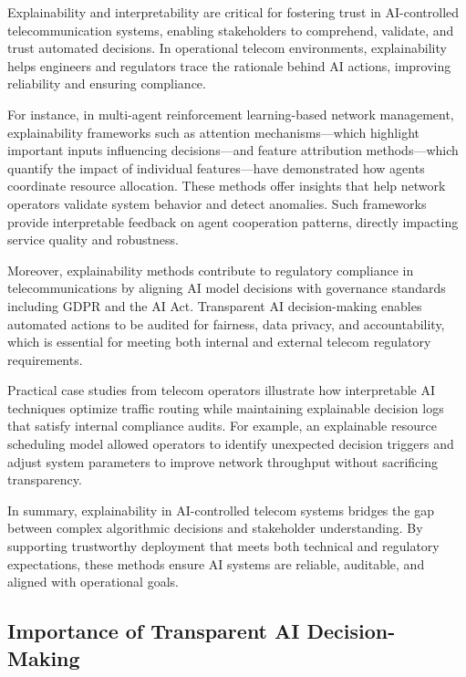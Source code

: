 \documentclass[sigconf]{acmart}
\begin{document}
Explainability and interpretability are critical for fostering trust in AI-controlled telecommunication systems, enabling stakeholders to comprehend, validate, and trust automated decisions. In operational telecom environments, explainability helps engineers and regulators trace the rationale behind AI actions, improving reliability and ensuring compliance.

For instance, in multi-agent reinforcement learning-based network management, explainability frameworks such as attention mechanisms—which highlight important inputs influencing decisions—and feature attribution methods—which quantify the impact of individual features—have demonstrated how agents coordinate resource allocation. These methods offer insights that help network operators validate system behavior and detect anomalies. Such frameworks provide interpretable feedback on agent cooperation patterns, directly impacting service quality and robustness.

Moreover, explainability methods contribute to regulatory compliance in telecommunications by aligning AI model decisions with governance standards including GDPR and the AI Act. Transparent AI decision-making enables automated actions to be audited for fairness, data privacy, and accountability, which is essential for meeting both internal and external telecom regulatory requirements.

Practical case studies from telecom operators illustrate how interpretable AI techniques optimize traffic routing while maintaining explainable decision logs that satisfy internal compliance audits. For example, an explainable resource scheduling model allowed operators to identify unexpected decision triggers and adjust system parameters to improve network throughput without sacrificing transparency.

In summary, explainability in AI-controlled telecom systems bridges the gap between complex algorithmic decisions and stakeholder understanding. By supporting trustworthy deployment that meets both technical and regulatory expectations, these methods ensure AI systems are reliable, auditable, and aligned with operational goals.

\subsection{Importance of Transparent AI Decision-Making}
\end{document}
